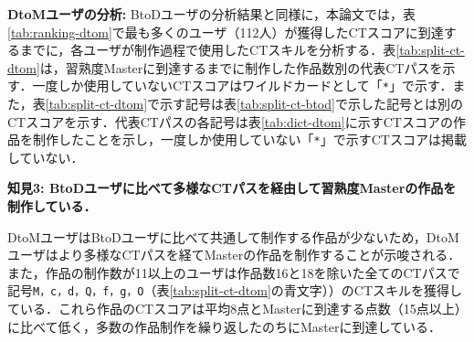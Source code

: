 \documentclass[submit]{ipsj}
\begin{document}
\noindent\textbf{DtoMユーザの分析: }BtoDユーザの分析結果と同様に，本論文では，表\ref{tab:ranking-dtom}で最も多くのユーザ（112人）が獲得したCTスコアに到達するまでに，各ユーザが制作過程で使用したCTスキルを分析する．表\ref{tab:split-ct-dtom}は，習熟度Masterに到達するまでに制作した作品数別の代表CTパスを示す．一度しか使用していないCTスコアはワイルドカードとして「\texttt{\large{*}}」で示す．また，表\ref{tab:split-ct-dtom}で示す記号は表\ref{tab:split-ct-btod}で示した記号とは別のCTスコアを示す．代表CTパスの各記号は表\ref{tab:dict-dtom}に示すCTスコアの作品を制作したことを示し，一度しか使用していない「\texttt{\large{*}}」で示すCTスコアは掲載していない．


\noindent\textbf{知見3: BtoDユーザに比べて多様なCTパスを経由して習熟度Masterの作品を制作している．}

DtoMユーザはBtoDユーザに比べて共通して制作する作品が少ないため，DtoMユーザはより多様なCTパスを経てMasterの作品を制作することが示唆される．
また，作品の制作数が11以上のユーザは作品数16と18を除いた全ての\textcolor{red}{}CTパスで記号\texttt{\large{M，c，d，Q，f，g，O}}（表\ref{tab:split-ct-dtom}の青文字））のCTスキルを獲得している．これら作品のCTスコアは平均8点とMasterに到達する点数（15点以上）に比べて低く，多数の作品制作を繰り返したのちにMasterに到達している．

\end{document}
